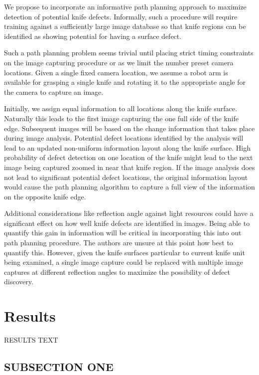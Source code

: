 \documentclass[letterpaper, 10 pt, conference]{ieeeconf}  %
\begin{document}
We propose to incorporate an informative path planning approach to maximize detection of potential knife defects. Informally, such a procedure will require training against a sufficiently large image database so that knife regions can be identified as showing potential for having a surface defect.

Such a path planning problem seems trivial until placing strict timing constraints on the image capturing procedure or as we limit the number preset camera locations. Given a single fixed camera location, we assume a robot arm is available for grasping a single knife and rotating it to the appropriate angle for the camera to capture an image.

Initially, we assign equal information to all locations along the knife surface. Naturally this leads to the first image capturing the one full side of the knife edge. Subsequent images will be based on the change information that takes place during image analysis. Potential defect locations identified by the analysis will lead to an updated non-uniform information layout along the knife surface. High probability of defect detection on one location of the knife might lead to the next image being captured zoomed in near that knife region. If the image analysis does not lead to significant potential defect locations, the original information layout would cause the path planning algorithm to capture a full view of the information on the opposite knife edge.

Additional considerations like reflection angle against light resources could have a significant effect on how well knife defects are identified in images. Being able to quantify this gain in information will be critical in incorporating this into out path planning procedure. The authors are unsure at this point how best to quantify this. However, given the knife surfaces particular to current knife unit being examined, a single image capture could be replaced with multiple image captures at different reflection angles to maximize the possibility of defect discovery.

\section{Results}

RESULTS TEXT

\subsection{SUBSECTION ONE}
\end{document}
